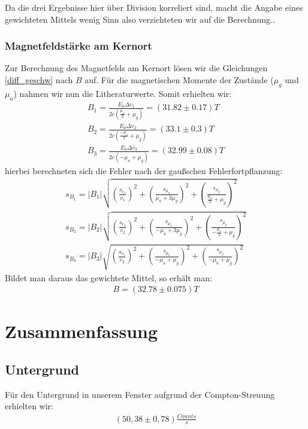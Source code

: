 \documentclass[12pt]{article}
\begin{document}
Da die drei Ergebnisse hier über Division korreliert sind, macht die Angabe eines gewichteten Mittels wenig Sinn also verzichteten wir auf die Berechnung..

\subsubsection{Magnetfeldstärke am Kernort}
Zur Berechnung des Magnetfelds am Kernort lösen wir die Gleichungen \ref{diff_geschw} nach $B$ auf. Für die magnetischen Momente der Zustände ($\mu_g$ 
und $\mu_a$) nahmen wir nun die Litheraturwerte. Somit erhielten wir:
\begin{align*}
 B_1 = \frac{E_0 \Delta v_1}{2c \left( \frac{\mu_a}{3}+\mu_g \right) } = (31.82\pm0.17)T \\
 B_2 = \frac{E_0 \Delta v_2}{2c \left( \frac{-\mu_a}{3}+\mu_g \right) } = (33.1\pm0.3)T \\
 B_3 = \frac{E_0 \Delta v_3}{2c \left( -\mu_a+\mu_g \right) } = (32.99\pm0.08)T
\end{align*}
hierbei berechneten sich die Fehler nach der gaußschen Fehlerfortpflanzung:
\begin{align*}
 s_{B_1} = \left| B_1 \right| \sqrt{\left( \frac{s_{v_1}}{v_1} \right) ^2 + \left( \frac{s_{\mu_a}}{\mu_a+3\mu_g} \right) ^2 + \left( \frac{s_{\mu_g}}{\frac{\mu_a}{3}+\mu_g} \right) ^2} \\
 s_{B_2} = \left| B_2 \right| \sqrt{\left( \frac{s_{v_2}}{v_2} \right) ^2 + \left( \frac{s_{\mu_a}}{-\mu_a+3\mu_g} \right) ^2 + \left( \frac{s_{\mu_g}}{-\frac{\mu_a}{3}+\mu_g} \right) ^2} \\
 s_{B_3} = \left| B_3 \right| \sqrt{\left( \frac{s_{v_3}}{v_3} \right) ^2 + \left( \frac{s_{\mu_a}}{-\mu_a+\mu_g} \right) ^2 + \left( \frac{s_{\mu_g}}{-\mu_a+\mu_g} \right) ^2} 
\end{align*}
Bildet man daraus das gewichtete Mittel, so erhält man:
\begin{align*}
 B = (32.78 \pm 0.075)T
\end{align*}

\section{Zusammenfassung}
\subsection*{Untergrund}
Für den Untergrund in unserem Fenster aufgrund der Compton-Streuung erhielten wir:
\begin{align*}
 (50,38 \pm 0,78) \frac{Counts}{s}
\end{align*}
\end{document}
